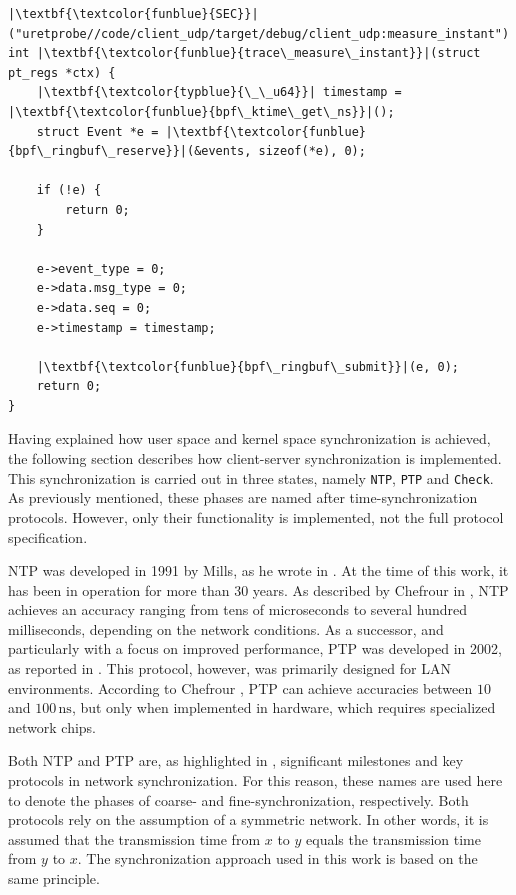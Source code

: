 \begin{listing}[H]
    \centering
\begin{verbatim}
|\textbf{\textcolor{funblue}{SEC}}|("uretprobe//code/client_udp/target/debug/client_udp:measure_instant")
int |\textbf{\textcolor{funblue}{trace\_measure\_instant}}|(struct pt_regs *ctx) {
    |\textbf{\textcolor{typblue}{\_\_u64}}| timestamp = |\textbf{\textcolor{funblue}{bpf\_ktime\_get\_ns}}|();
    struct Event *e = |\textbf{\textcolor{funblue}{bpf\_ringbuf\_reserve}}|(&events, sizeof(*e), 0);
    
    if (!e) {
        return 0;
    }

    e->event_type = 0;
    e->data.msg_type = 0;
    e->data.seq = 0;
    e->timestamp = timestamp;

    |\textbf{\textcolor{funblue}{bpf\_ringbuf\_submit}}|(e, 0);
    return 0;
}

\end{verbatim}
\caption{Handling uretprobe in BPF}
\label{lst:bpf_uprobe}
\end{listing}

Having explained how user space and kernel space synchronization is achieved, the following section describes how client-server synchronization is implemented.  
This synchronization is carried out in three states, namely \texttt{\ac{NTP}}, \texttt{\ac{PTP}} and \texttt{Check}.  
As previously mentioned, these phases are named after time-synchronization protocols.
However, only their functionality is implemented, not the full protocol specification.  

\ac{NTP} was developed in 1991 by Mills, as he wrote in \cite{103043}.  
At the time of this work, it has been in operation for more than 30 years.  
As described by Chefrour in \cite[p.~31]{CHEFROUR202226}, \ac{NTP} achieves an accuracy ranging from tens of microseconds to several hundred milliseconds, depending on the network conditions.  
As a successor, and particularly with a focus on improved performance, \ac{PTP} was developed in 2002, as reported in \cite{1048550}.  
This protocol, however, was primarily designed for \ac{LAN} environments.  
According to Chefrour \cite[p.~31]{CHEFROUR202226}, \ac{PTP} can achieve accuracies between $10$ and $100\,\text{ns}$, but only when implemented in hardware, which requires specialized network chips.  

Both \ac{NTP} and \ac{PTP} are, as highlighted in \cite[p.~29]{CHEFROUR202226}, significant milestones and key protocols in network synchronization.  
For this reason, these names are used here to denote the phases of coarse- and fine-synchronization, respectively.  
Both protocols rely on the assumption of a symmetric network.  
In other words, it is assumed that the transmission time from $x$ to $y$ equals the transmission time from $y$ to $x$.  
The synchronization approach used in this work is based on the same principle.  


